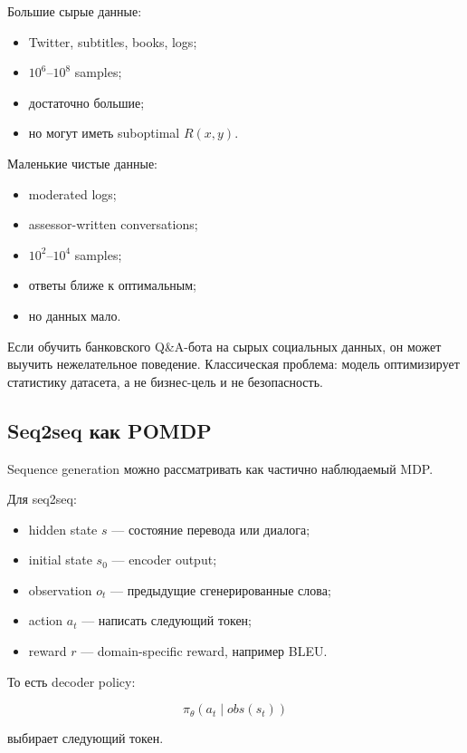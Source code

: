 \documentclass[a4paper,12pt]{article}
\begin{document}
Большие сырые данные:

\begin{itemize}
    \item Twitter, subtitles, books, logs;
    \item \(10^6\)--\(10^8\) samples;
    \item достаточно большие;
    \item но могут иметь suboptimal \(R(x,y)\).
\end{itemize}

Маленькие чистые данные:

\begin{itemize}
    \item moderated logs;
    \item assessor-written conversations;
    \item \(10^2\)--\(10^4\) samples;
    \item ответы ближе к оптимальным;
    \item но данных мало.
\end{itemize}

Если обучить банковского Q\&A-бота на сырых социальных данных, он может выучить нежелательное поведение. Классическая проблема: модель оптимизирует статистику датасета, а не бизнес-цель и не безопасность.

\subsection{Seq2seq как POMDP}

Sequence generation можно рассматривать как частично наблюдаемый MDP.

Для seq2seq:

\begin{itemize}
    \item hidden state \(s\) --- состояние перевода или диалога;
    \item initial state \(s_0\) --- encoder output;
    \item observation \(o_t\) --- предыдущие сгенерированные слова;
    \item action \(a_t\) --- написать следующий токен;
    \item reward \(r\) --- domain-specific reward, например BLEU.
\end{itemize}

То есть decoder policy:

\[
\pi_\theta(a_t \mid obs(s_t))
\]

выбирает следующий токен.
\end{document}
